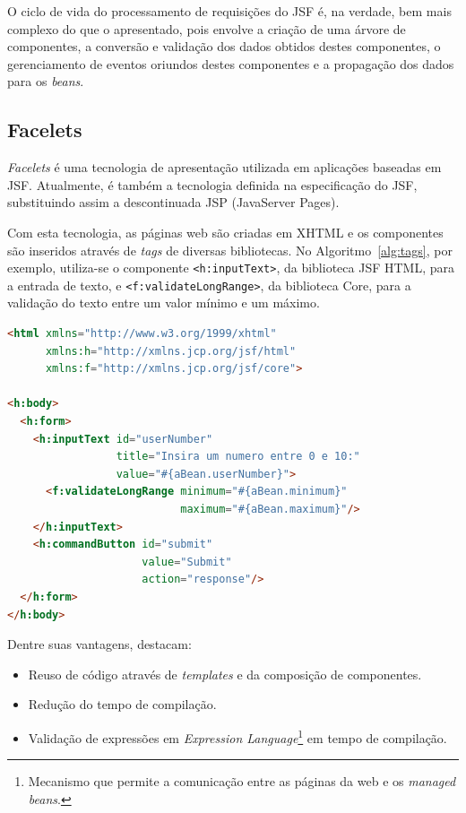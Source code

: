 \documentclass[
  10.5pt,				  %
	openright,			%
	twoside,			  %
  a5paper,
  chapter=TITLE,	%
	section=TITLE,	%
  hyphens,        %
	english,        %
	brazil          %
]{abntex2}
\begin{document}
O ciclo de vida do processamento de requisições do JSF é, na verdade, bem mais complexo do que o apresentado, pois envolve a criação de uma árvore de componentes, a conversão e validação dos dados obtidos destes componentes, o gerenciamento de eventos oriundos destes componentes e a propagação dos dados para os \emph{beans}.



\subsection{Facelets}\label{sec:facelets}
\emph{Facelets} é uma tecnologia de apresentação utilizada em aplicações baseadas em JSF. Atualmente, é também a tecnologia definida na especificação do JSF, substituindo assim a descontinuada JSP (JavaServer Pages).

Com esta tecnologia, as páginas web são criadas em XHTML e os componentes são inseridos através de \emph{tags} de diversas bibliotecas. No Algoritmo~\ref{alg:tags}, por exemplo, utiliza-se o componente \texttt{<h:inputText>}, da biblioteca JSF HTML, para a entrada de texto, e \texttt{<f:validateLongRange>}, da biblioteca Core, para a validação do texto entre um valor mínimo e um máximo.

\begin{lstlisting}[language=html, caption={Utilização de \emph{tags} em um arquivo XHTML.}, label={alg:tags}]
<html xmlns="http://www.w3.org/1999/xhtml"
      xmlns:h="http://xmlns.jcp.org/jsf/html"
      xmlns:f="http://xmlns.jcp.org/jsf/core">

<h:body>
  <h:form>
    <h:inputText id="userNumber"
                 title="Insira um numero entre 0 e 10:"
                 value="#{aBean.userNumber}">
      <f:validateLongRange minimum="#{aBean.minimum}"
                           maximum="#{aBean.maximum}"/>
    </h:inputText>
    <h:commandButton id="submit"
                     value="Submit"
                     action="response"/>
  </h:form>
</h:body>
\end{lstlisting}


Dentre suas vantagens, \cite{javaee7} destacam:
\begin{itemize}
  \item Reuso de código através de \emph{templates} e da composição de componentes.
  \item Redução do tempo de compilação.
  \item Validação de expressões em \emph{Expression Language}\footnote{Mecanismo que permite a comunicação entre as páginas da web e os \emph{managed beans}.} em tempo de compilação.
\end{itemize}
\end{document}
